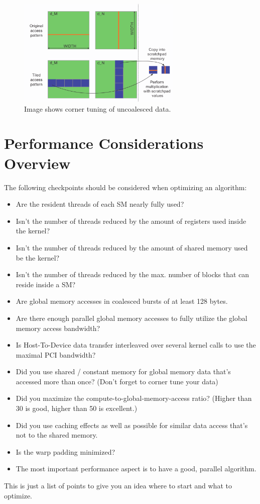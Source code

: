 \begin{figure}[H]
	\centering
	\includegraphics[width=0.7\textwidth]{imgs/cornerTuning.png}
	\caption[Figure]{Image shows corner tuning of uncoalesced data. \cite[Parallel Computing Book, p. 110]{ParaComputation}}
	\label{fig:gpuCornerTuning}
\end{figure}

\pagebreak

\section{Performance Considerations Overview}

The following checkpoints should be considered when optimizing an algorithm:
\begin{itemize}
	\item Are the resident threads of each SM nearly fully used?
	\item Isn't the number of threads reduced by the amount of registers used inside the kernel?
	\item Isn't the number of threads reduced by the amount of shared memory used be the kernel?
	\item Isn't the number of threads reduced by the max. number of blocks that can reside inside a SM?
	\item Are global memory accesses in coalesced bursts of at least 128 bytes.
	\item Are there enough parallel global memory accesses to fully utilize the global memory access bandwidth?
	\item Is Host-To-Device data transfer interleaved over several kernel calls to use the maximal PCI bandwidth?
	\item Did you use shared  / constant memory for global memory data that's accessed more than once? (Don't forget to corner tune your data)
	\item Did you maximize the compute-to-global-memory-access ratio? (Higher than 30 is good, higher than 50 is excellent.)
	\item Did you use caching effects as well as possible for similar data access that's not to the shared memory.
	\item Is the warp padding minimized?
	\item The most important performance aspect is to have a good, parallel algorithm.
\end{itemize}

This is just a list of points to give you an idea where to start and what to optimize.


